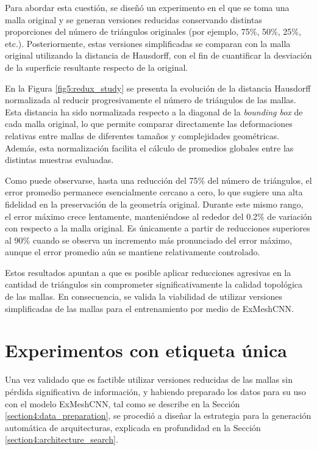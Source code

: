 Para abordar esta cuestión, se diseñó un experimento en el que se toma una malla original y se generan versiones reducidas conservando distintas proporciones del número de triángulos originales (por ejemplo, 75\%, 50\%, 25\%, etc.). Posteriormente, estas versiones simplificadas se comparan con la malla original utilizando la distancia de Hausdorff, con el fin de cuantificar la desviación de la superficie resultante respecto de la original.

En la Figura \ref{fig5:redux_study} se presenta la evolución de la distancia Hausdorff normalizada al reducir progresivamente el número de triángulos de las mallas. Esta distancia ha sido normalizada respecto a la diagonal de la \textit{bounding box} de cada malla original, lo que permite comparar directamente las deformaciones relativas entre mallas de diferentes tamaños y complejidades geométricas. Además, esta normalización facilita el cálculo de promedios globales entre las distintas muestras evaluadas.

Como puede observarse, hasta una reducción del 75\% del número de triángulos, el error promedio permanece esencialmente cercano a cero, lo que sugiere una alta fidelidad en la preservación de la geometría original. Durante este mismo rango, el error máximo crece lentamente, manteniéndose al rededor del 0.2\% de variación con respecto a la malla original. Es únicamente a partir de reducciones superiores al 90\% cuando se observa un incremento más pronunciado del error máximo, aunque el error promedio aún se mantiene relativamente controlado.

Estos resultados apuntan a que es posible aplicar reducciones agresivas en la cantidad de triángulos sin comprometer significativamente la calidad topológica de las mallas. En consecuencia, se valida la viabilidad de utilizar versiones simplificadas de las mallas para el entrenamiento por medio de ExMeshCNN.

\section{Experimentos con etiqueta única}
Una vez validado que es factible utilizar versiones reducidas de las mallas sin pérdida significativa de información, y habiendo preparado los datos para su uso con el modelo ExMeshCNN, tal como se describe en la Sección \ref{section4:data_preparation}, se procedió a diseñar la estrategia para la generación automática de arquitecturas, explicada en profundidad en la Sección \ref{section4:architecture_search}.

